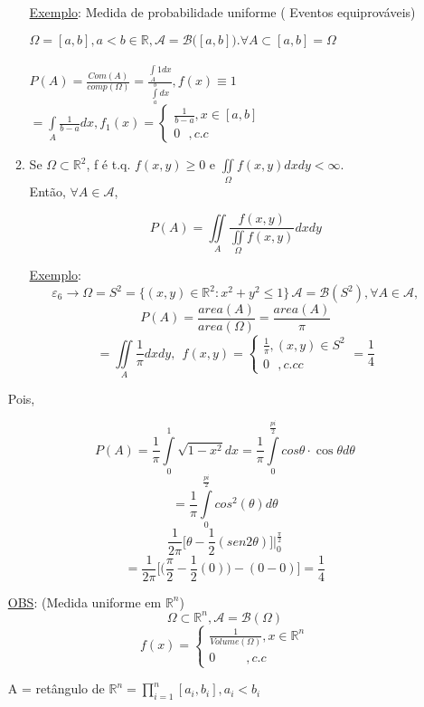 \documentclass[a4paper,12pt]{article}
\begin{document}
\begin{enumerate}[label = \alph*)]
\begin{enumerate}[label=\alph*)]
	 \underline{Exemplo}: Medida de probabilidade uniforme ( Eventos equiprováveis)
	 
	 $\Omega =[a,b], a<b\in \mathbb{R}, \mathscr{A}=\mathscr{B}\bigg([a,b]\bigg). \forall A\subset [a,b]=\Omega$\\
	 \\
	 $P(A) = \frac{Com(A)}{comp(\Omega)}= \frac{\int\limits_A 1dx}{\int\limits_a^b dx}, f(x)\equiv 1 $\\
$=\int\limits_{A} \frac{1}{b-a} dx, f_1(x) = \begin{cases}
\frac{1}{b-a}, x\in[a,b]\\
0 \ \ \ , c.c
\end{cases}$

\item Se $\Omega \subset \mathbb{R}^2$, f é t.q. $f(x,y)\ge0$ e $\iint\limits_{\Omega } f(x,y) dx dy <\infty$.\\ Então, $\forall A\in \mathscr{A}$,

$$P(A)=\iint\limits_{A}\frac{f(x,y)}{\iint\limits_{\Omega} f(x,y)} dxdy $$

\underline{Exemplo}: 
$$\varepsilon_6 \rightarrow \Omega=S^2=\{(x,y)\in \mathbb{R}^2: x^2+y^2\le 1\} \, \mathscr{A}=\mathscr{B}(S^2),\forall A\in \mathscr{A},$$
$$P(A)=\frac{area(A)}{area(\Omega)}= \frac{area(A)}{\pi} $$
$$=\iint\limits_{A} \frac{1}{\pi}dxdy, \ \ f(x,y)= \begin{cases}
\frac{1}{\pi}, (x,y)\in S^2\\
0\  \ \ , c.cc
\end{cases}=\frac{1}{4}
$$
\end{enumerate}
\newpage
Pois,

$$P(A) = \frac{1}{\pi} \int\limits_{0}^1 \sqrt{1-x^2} dx =\frac{1}{\pi}\int\limits_{0}^{\frac{pi}{2}} cos\theta\cdot\cos\theta d\theta $$
$$=\frac{1}{\pi} \int\limits_{0}^{\frac{pi}{2}} cos^2(\theta) d\theta$$
$$\frac{1}{2\pi} \bigg[\theta - \frac{1}{2}(sen 2\theta)\bigg]\bigg\vert^{\frac{\pi}{2}}_{0}$$
$$=\frac{1}{2\pi}\bigg[\bigg(\frac{\pi}{2}-\frac{1}{2}(0)\bigg)-(0-0)\bigg] = \frac{1}{4} $$

\underline{OBS}: (Medida uniforme em $\mathbb{R}^n$)
$$\Omega \subset \mathbb{R}^n, \mathscr{A=\mathscr{B}(\Omega)}$$
$$f(x)=\begin{cases}
\frac{1}{Volume(\Omega)}, x\in \mathbb{R}^n\\
0\ \ \ \ \ \ \ \  \ \  \ ,c.c
\end{cases} $$

A = retângulo de $\mathbb{R}^n=\prod\limits_{i=1}^n[a_i,b_i], a_i<b_i$
\newpage

\end{enumerate}
\end{document}
